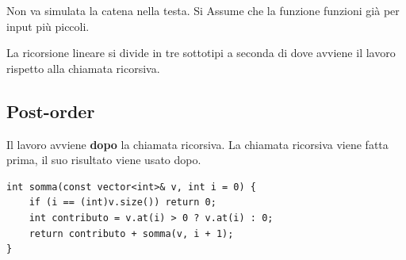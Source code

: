 Non va simulata la catena nella testa.  Si Assume che la funzione funzioni già per input più piccoli.

\newpage

La ricorsione lineare si divide in tre sottotipi a seconda di dove avviene il lavoro rispetto alla chiamata ricorsiva.

\subsection{Post-order}
    Il lavoro avviene \textbf{dopo} la chiamata ricorsiva. La chiamata ricorsiva viene fatta prima, il suo risultato viene usato dopo.


\begin{codeexample}

  \begin{codebox}
    \begin{lstlisting}
int somma(const vector<int>& v, int i = 0) {
    if (i == (int)v.size()) return 0;
    int contributo = v.at(i) > 0 ? v.at(i) : 0;
    return contributo + somma(v, i + 1);
}
    \end{lstlisting}
  \end{codebox}

\end{codeexample}



